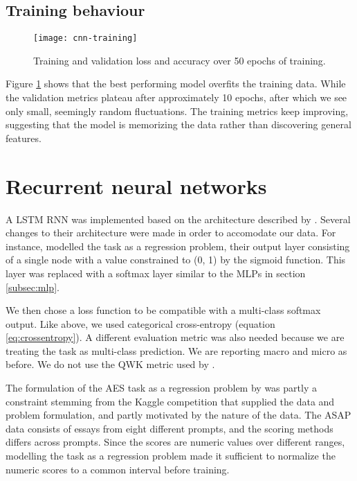 \subsection{Training behaviour}

\begin{figure}
  \centering
  \texttt{[image: cnn-training]}
  \caption{Training and validation loss and accuracy over 50 epochs of training.}
  \label{fig:cnn-training}
\end{figure}

Figure \ref{fig:cnn-training} shows that the best performing model overfits
the training data. While the validation metrics plateau after approximately
10 epochs, after which we see only small, seemingly random fluctuations.
The training metrics keep improving, suggesting that the model is memorizing
the data rather than discovering general features.


\section{Recurrent neural networks}

A \ac{LSTM} \ac{RNN} was implemented based on the architecture described by
\textcite{taghipour16}. Several changes to their architecture were made in
order to accomodate our data. For instance, \citeauthor{taghipour16} modelled
the task as a regression problem, their output layer consisting of a single
node with a value constrained to (0, 1) by the sigmoid function. This layer
was replaced with a softmax layer similar to the \acp{MLP} in section
\ref{subsec:mlp}.

We then chose a loss function to be compatible with a multi-class softmax
output. Like above, we used categorical cross-entropy (equation
\ref{eq:crossentropy}). A different evaluation metric was also needed because
we are treating the task as multi-class prediction. We are reporting macro
and micro \FI as before. We do not use the \ac{QWK} metric used by
\citeauthor{taghipour16}. 

The formulation of the \ac{AES} task as a regression problem by
\citeauthor{taghipour16} was partly a constraint stemming from the Kaggle
competition that supplied the data and problem formulation, and partly
motivated by the nature of the data. The ASAP data consists of essays from
eight different prompts, and the scoring methods differs across prompts.
Since the scores are numeric values over different ranges, modelling the task
as a regression problem made it sufficient to normalize the numeric scores to
a common interval before training.

